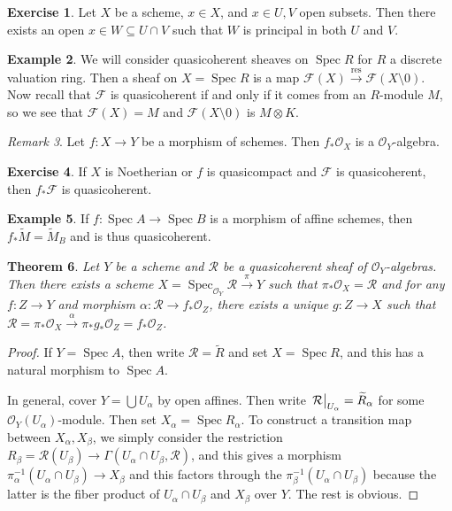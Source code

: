 \documentclass[leqno, openany]{memoir}
\newtheorem{thm}{Theorem}[section]
\theoremstyle{definition}
\newtheorem{exm}[thm]{Example}
\newtheorem{exer}[thm]{Exercise}
\theoremstyle{remark}
\newtheorem{rmk}[thm]{Remark}
\theoremstyle{plain}
\theoremstyle{definition}
\theoremstyle{remark}
\newcommand{\mc}[1]{\mathcal{#1}}
\newcommand{\mr}[1]{\mathrm{#1}}
\newcommand{\wt}[1]{\widetilde{#1}}
\DeclareMathOperator{\Spec}{Spec}
\begin{document}
\begin{exer} Let $X$ be a scheme, $x \in X$, and $x \in U,V$ open subsets. Then
there exists an open $x \in W \subseteq U \cap V$ such that $W$ is principal in
both $U$ and $V$.  \end{exer}

\begin{exm} We will consider quasicoherent sheaves on $\Spec R$ for $R$ a
    discrete valuation ring. Then a sheaf on $X = \Spec R$ is a map $\mc{F}(X)
    \xrightarrow{\mr{res}} \mc{F}(X \setminus \qty{0})$. Now recall that
    $\mc{F}$ is quasicoherent if and only if it comes from an $R$-module $M$,
    so we see that $\mc{F}(X) = M$ and $\mc{F}(X \setminus \qty{0})$ is $M
    \otimes K$.  \end{exm}

\begin{rmk} Let $f \colon X \to Y$ be a morphism of schemes. Then $f_*
\mc{O}_X$ is a $\mc{O}_Y$-algebra.  \end{rmk}

\begin{exer} If $X$ is Noetherian or $f$ is quasicompact and $\mc{F}$ is
quasicoherent, then $f_* \mc{F}$ is quasicoherent.  \end{exer}

\begin{exm} If $f \colon \Spec A \to \Spec B$ is a morphism of affine schemes,
then $f_* \wt{M} = \wt{M}_B$ and is thus quasicoherent.  \end{exm}

\begin{thm} Let $Y$ be a scheme and $\mc{R}$ be a quasicoherent sheaf of
    $\mc{O}_Y$-algebras. Then there exists a scheme $X = \Spec_{\mc{O}_Y}
    \mc{R} \xrightarrow{\pi} Y$ such that $\pi_* \mc{O}_X = \mc{R}$ and for any
    $f \colon Z \to Y$ and morphism $\alpha \colon \mc{R} \to f_* \mc{O}_Z$,
    there exists a unique $g \colon Z \to X$ such that $\mc{R} = \pi_* \mc{O}_X
    \xrightarrow{\alpha} \pi_* g_* \mc{O}_Z = f_* \mc{O}_Z$.  \end{thm}

\begin{proof} If $Y = \Spec A$, then write $\mc{R} = \wt{R}$ and set $X = \Spec
    R$, and this has a natural morphism to $\Spec A$.

    In general, cover $Y = \bigcup U_{\alpha}$ by open affines. Then write
$\eval{\mc{R}}_{U_{\alpha}} = \wt{R}_{\alpha}$ for some
$\mc{O}_Y(U_{\alpha})$-module. Then set $X_{\alpha} = \Spec R_{\alpha}$. To
construct a transition map between $X_{\alpha}, X_{\beta}$, we simply consider
the restriction $R_{\beta} = \mc{R}(U_{\beta}) \to \Gamma(U_{\alpha} \cap
U_{\beta}, \mc{R})$, and this gives a morphism $\pi_{\alpha}^{-1}(U_{\alpha}
\cap U_{\beta}) \to X_{\beta}$ and this factors through the
$\pi_{\beta}^{-1}(U_{\alpha} \cap U_{\beta})$ because the latter is the fiber
product of $U_{\alpha} \cap U_{\beta}$ and $X_{\beta}$ over $Y$. The rest is
obvious.  \end{proof}
\end{document}
